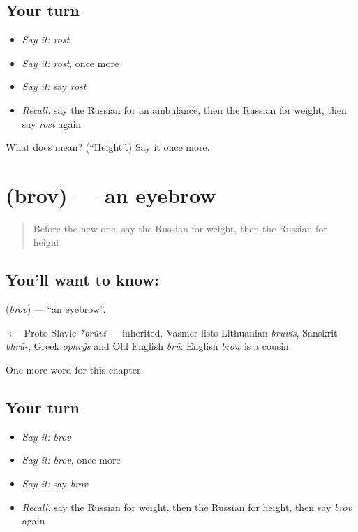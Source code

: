 \subsection*{Your turn}
\begin{itemize}
\raggedright
  \item \emph{Say it:} \emph{rost}
  \item \emph{Say it:} \emph{rost}, once more
  \item \emph{Say it:} say \emph{rost}
  \item \emph{Recall:} say the Russian for an ambulance, then the Russian for weight, then say \emph{rost} again
\end{itemize}

\begin{tcolorbox}[breakable,colback=teal!4,colframe=teal!35!black,title={Before you move on}]
What does  mean? (\textquotedblleft{}Height\textquotedblright{}.) Say it once more.
\end{tcolorbox}
\section[\texorpdfstring{\ru{бровь} (brov)}{бровь (brov)}]{ (brov) — an eyebrow}

\label{lesson:RU-C239-brov}



\begin{quote}
Before the new one: say the Russian for weight, then the Russian for height.
\end{quote}

\subsection*{You'll want to know: }
\textbf{} (\emph{brov}) — \textquotedblleft{}an eyebrow\textquotedblright{}.

\begin{cousinweb}
\textbf{} $\leftarrow$ Proto-Slavic \emph{*brŭvĭ} — inherited. Vasmer lists Lithuanian \emph{bruvìs}, Sanskrit \emph{bhrū-}, Greek \emph{ophrŷs} and Old English \emph{brū}: English \emph{brow} is a cousin.
\end{cousinweb}

\begin{grammarlens}[title={What you've built}]
One more word for this chapter.
\end{grammarlens}

\subsection*{Your turn}
\begin{itemize}
\raggedright
  \item \emph{Say it:} \emph{brov}
  \item \emph{Say it:} \emph{brov}, once more
  \item \emph{Say it:} say \emph{brov}
  \item \emph{Recall:} say the Russian for weight, then the Russian for height, then say \emph{brov} again
\end{itemize}

